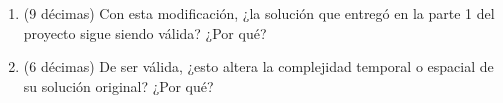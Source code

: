 
\begin{enumerate}
  \item (9 décimas) Con esta modificación, ¿la solución que entregó en la parte 1 del proyecto sigue siendo válida? ¿Por qué?
  \item (6 décimas) De ser válida, ¿esto altera la complejidad temporal o espacial de su solución original? ¿Por qué?
\end{enumerate}

\bigskip
